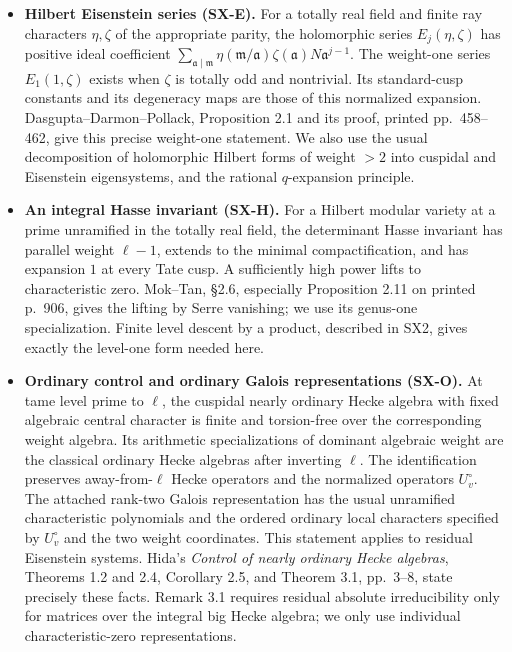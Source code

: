 \begin{itemize}
\item \textbf{Hilbert Eisenstein series (SX-E).}
For a totally real field and finite ray characters $\eta,\zeta$ of
the appropriate parity, the holomorphic series $E_j(\eta,\zeta)$
has positive ideal coefficient
$\sum_{\mathfrak a\mid\mathfrak m}
 \eta(\mathfrak m/\mathfrak a)\zeta(\mathfrak a)
 N\mathfrak a^{j-1}$.
The weight-one series $E_1(1,\zeta)$ exists when $\zeta$ is totally
odd and nontrivial.  Its standard-cusp constants and its degeneracy
maps are those of this normalized expansion.
Dasgupta--Darmon--Pollack, Proposition 2.1 and its proof, printed
pp.~458--462, give this precise weight-one statement.  We also use
the usual decomposition of holomorphic Hilbert forms of weight $>2$
into cuspidal and Eisenstein eigensystems, and the rational
$q$-expansion principle.

\item \textbf{An integral Hasse invariant (SX-H).}
For a Hilbert modular variety at a prime unramified in the totally
real field, the determinant Hasse invariant has parallel weight
$\ell-1$, extends to the minimal compactification, and has expansion
$1$ at every Tate cusp.  A sufficiently high power lifts to
characteristic zero.  Mok--Tan, \S2.6, especially Proposition 2.11
on printed p.~906, gives the lifting by Serre vanishing; we use its
genus-one specialization.  Finite level descent by a product, described
in SX2, gives exactly the level-one form needed here.

\item \textbf{Ordinary control and ordinary Galois representations
(SX-O).}
At tame level prime to $\ell$, the cuspidal nearly ordinary Hecke
algebra with fixed algebraic central character is finite and
torsion-free over the corresponding weight algebra.  Its arithmetic
specializations of dominant algebraic weight are the classical
ordinary Hecke algebras after inverting $\ell$.  The identification
preserves away-from-$\ell$ Hecke operators and the normalized
operators $U_v^{\circ}$.  The attached rank-two Galois representation
has the usual unramified characteristic polynomials and the ordered
ordinary local characters specified by $U_v^{\circ}$ and the two
weight coordinates.  This statement applies to residual Eisenstein
systems.  Hida's \emph{Control of nearly ordinary Hecke algebras},
Theorems 1.2 and 2.4, Corollary 2.5, and Theorem 3.1, pp.~3--8,
state precisely these facts.  Remark 3.1 requires residual absolute
irreducibility only for matrices over the integral big Hecke algebra;
we only use individual characteristic-zero representations.


\end{itemize}

